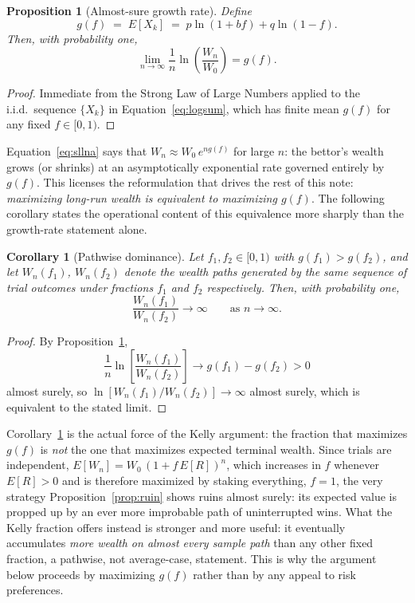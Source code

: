 \documentclass[11pt]{article}
\newtheorem{proposition}{Proposition}
\newtheorem{corollary}{Corollary}
\theoremstyle{remark}
\theoremstyle{definition}
\begin{document}
\begin{proposition}[Almost-sure growth rate]
\label{prop:sllna}
Define
\begin{equation}
g(f) \;=\; E[X_k] \;=\; p\ln(1+bf) + q\ln(1-f).
\label{eq:gdef}
\end{equation}
Then, with probability one,
\begin{equation}
\lim_{n\to\infty} \frac{1}{n}\ln\!\left(\frac{W_n}{W_0}\right) = g(f).
\label{eq:sllna}
\end{equation}
\end{proposition}
\begin{proof}
Immediate from the Strong Law of Large Numbers applied to the i.i.d.\ sequence $\{X_k\}$ in Equation~\eqref{eq:logsum}, which has finite mean $g(f)$ for any fixed $f\in[0,1)$.
\end{proof}

Equation~\eqref{eq:sllna} says that $W_n \approx W_0\, e^{n g(f)}$ for large $n$: the bettor's wealth grows (or shrinks) at an asymptotically exponential rate governed entirely by $g(f)$. This licenses the reformulation that drives the rest of this note: \emph{maximizing long-run wealth is equivalent to maximizing $g(f)$}. The following corollary states the operational content of this equivalence more sharply than the growth-rate statement alone.

\begin{corollary}[Pathwise dominance]
\label{cor:dominance}
Let $f_1,f_2\in[0,1)$ with $g(f_1) > g(f_2)$, and let $W_n(f_1)$, $W_n(f_2)$ denote the wealth paths generated by the same sequence of trial outcomes under fractions $f_1$ and $f_2$ respectively. Then, with probability one,
\begin{equation}
\frac{W_n(f_1)}{W_n(f_2)} \longrightarrow \infty \qquad \text{as } n\to\infty.
\end{equation}
\end{corollary}
\begin{proof}
By Proposition~\ref{prop:sllna},
\begin{equation*}
\frac{1}{n}\ln\!\left[\frac{W_n(f_1)}{W_n(f_2)}\right] \to g(f_1)-g(f_2) > 0
\end{equation*}
almost surely, so $\ln[W_n(f_1)/W_n(f_2)] \to \infty$ almost surely, which is equivalent to the stated limit.
\end{proof}

Corollary~\ref{cor:dominance} is the actual force of the Kelly argument: the fraction that maximizes $g(f)$ is \emph{not} the one that maximizes expected terminal wealth. Since trials are independent, $E[W_n]=W_0\,(1+f\,E[R])^n$, which increases in $f$ whenever $E[R]>0$ and is therefore maximized by staking everything, $f=1$, the very strategy Proposition~\ref{prop:ruin} shows ruins almost surely: its expected value is propped up by an ever more improbable path of uninterrupted wins. What the Kelly fraction offers instead is stronger and more useful: it eventually accumulates \emph{more wealth on almost every sample path} than any other fixed fraction, a pathwise, not average-case, statement. This is why the argument below proceeds by maximizing $g(f)$ rather than by any appeal to risk preferences.
\end{document}

